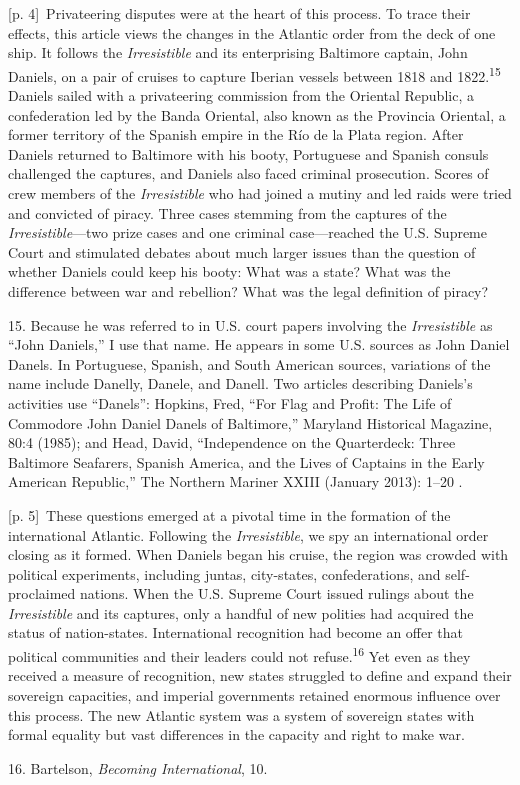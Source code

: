 \documentclass[10pt,a4paper]{article}
\begin{document}
{\scriptsize\color{gray} [p. 4]}\ Privateering disputes were at the heart of this process. To trace their effects, this article views the changes in the Atlantic order from the deck of one ship. It follows the \textit{Irresistible} and its enterprising Baltimore captain, John Daniels, on a pair of cruises to capture Iberian vessels between 1818 and 1822.\nobreak\textsuperscript{15} Daniels sailed with a privateering commission from the Oriental Republic, a confederation led by the Banda Oriental, also known as the Provincia Oriental, a former territory of the Spanish empire in the Río de la Plata region. After Daniels returned to Baltimore with his booty, Portuguese and Spanish consuls challenged the captures, and Daniels also faced criminal prosecution. Scores of crew members of the \textit{Irresistible} who had joined a mutiny and led raids were tried and convicted of piracy. Three cases stemming from the captures of the \textit{Irresistible}—two prize cases and one criminal case—reached the U.S. Supreme Court and stimulated debates about much larger issues than the question of whether Daniels could keep his booty: What was a state? What was the difference between war and rebellion? What was the legal definition of piracy?\par{\small 15. Because he was referred to in U.S. court papers involving the \textit{Irresistible} as “John Daniels,” I use that name. He appears in some U.S. sources as John Daniel Danels. In Portuguese, Spanish, and South American sources, variations of the name include Danelly, Danele, and Danell. Two articles describing Daniels’s activities use “Danels”: Hopkins, Fred, “For Flag and Profit: The Life of Commodore John Daniel Danels of Baltimore,” Maryland Historical Magazine, 80:4 (1985); and Head, David, “Independence on the Quarterdeck: Three Baltimore Seafarers, Spanish America, and the Lives of Captains in the Early American Republic,” The Northern Mariner XXIII (January 2013): 1–20 .\par}
{\scriptsize\color{gray} [p. 5]}\ These questions emerged at a pivotal time in the formation of the international Atlantic. Following the \textit{Irresistible}, we spy an international order closing as it formed. When Daniels began his cruise, the region was crowded with political experiments, including juntas, city-states, confederations, and self-proclaimed nations. When the U.S. Supreme Court issued rulings about the \textit{Irresistible} and its captures, only a handful of new polities had acquired the status of nation-states. International recognition had become an offer that political communities and their leaders could not refuse.\nobreak\textsuperscript{16} Yet even as they received a measure of recognition, new states struggled to define and expand their sovereign capacities, and imperial governments retained enormous influence over this process. The new Atlantic system was a system of sovereign states with formal equality but vast differences in the capacity and right to make war.\par{\small 16. Bartelson, \textit{Becoming International}, 10.\par}
\end{document}

